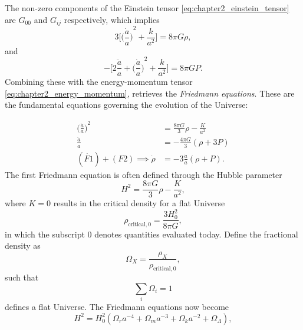 The non-zero components of the Einstein tensor \cref{eq:chapter2_einstein_tensor} are \(G_{00}\) and \(G_{i j}\) respectively, which implies
%
\begin{equation}
	3\Bigg[ {\bigg(\frac{\dot{a}}{a}\bigg)}^{2} + \frac{k}{a^{2}} \Bigg]
	= 8\pi G\rho,
\end{equation}
%
and
%
\begin{equation}
	-\Bigg[ 2\frac{\ddot{a}}{a} + {\bigg(\frac{\dot{a}}{a}\bigg)}^{2} + \frac{k}{a^{2}} \Bigg]
	= 8\pi G P.
\end{equation}
%
Combining these with the energy-momentum tensor \cref{eq:chapter2_energy_momentum}, retrieves the \emph{Friedmann equations}.
These are the fundamental equations governing the evolution of the Universe:
%
\addtocounter{equation}{-1}
%
\begin{subequations}
	\begin{align}
		{\bigg(\frac{\dot{a}}{a}\bigg)}^{2}   & = \frac{8\pi G}{3} \rho - \frac{K}{a^{2}} \tag{F1} \label{eq:chapter2_F1} \\
		\frac{\ddot{a}}{a}                    & = -\frac{4\pi G}{3}(\rho + 3P) \tag{F2}                                   \\
		(\dot{F1}) + (F2) \implies \dot{\rho} & = -3\frac{\dot{a}}{a}(\rho + P). \tag{F3}
	\end{align}
\end{subequations}
%
The first Friedmann equation is often defined through the Hubble parameter
%
\begin{equation}
	H^{2}
	= \frac{8\pi G}{3} \rho - \frac{K}{a^{2}},
\end{equation}
%
where \(K=0\) results in the critical density for a flat Universe
%
\begin{equation}
	\rho_{\text{critical},0}
	= \frac{3H_{0}^{2}}{8\pi G},
\end{equation}
%
in which the subscript \(0\) denotes quantities evaluated today.
Define the fractional density as
%
\begin{equation}
	\Omega_{X}
	= \frac{\rho_{X}}{\rho_{\text{critical},0}},
\end{equation}
%
such that
%
\begin{equation}
	\sum\limits_{i}\Omega_{i}
	= 1
\end{equation}
%
defines a flat Universe.
The Friedmann equations now become
%
\begin{equation}
	H^{2}
	= H_{0}^{2} (\Omega_{r}a^{-4} + \Omega_{m}a^{-3} + \Omega_{k}a^{-2} + \Omega_{\Lambda}),
\end{equation}
